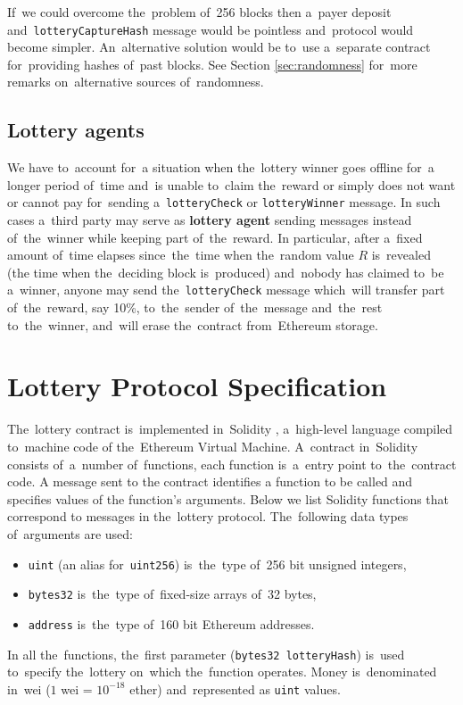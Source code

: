 \documentclass[a4paper]{article}
\begin{document}
    If~we could overcome the~problem of~256 blocks then a~payer deposit and~\texttt{lotteryCaptureHash} message would
    be pointless and~protocol would become simpler. An~alternative solution would be to~use a~separate contract
    for~providing hashes of~past blocks. See Section \ref{sec:randomness} for~more remarks on~alternative sources
    of~randomness.
\subsection{Lottery agents}
    We have to~account for~a situation when the~lottery winner goes offline for~a longer period of~time and~is
    unable to~claim the~reward or simply does not want or cannot pay for~sending a~\texttt{lotteryCheck} or
    \texttt{lotteryWinner} message. In such cases a~third party may serve as \textbf{lottery agent} sending messages
    instead of~the~winner while keeping part of~the~reward. In particular, after a~fixed amount of~time elapses
    since~the~time when the~random value $R$ is~revealed (the time when the~deciding block is~produced) and~nobody has
    claimed to~be a~winner, anyone may send the~\texttt{lotteryCheck} message which~will transfer part of~the~reward,
    say 10\%, to~the~sender of~the~message and~the~rest to~the~winner, and~will erase the~contract from~Ethereum
    storage.

\section{Lottery Protocol Specification}
\label{sec:lottery-protocol}
    The~lottery contract is~implemented in~Solidity \cite{SOLIDITY}, a~high-level language compiled to~machine code of
    the~Ethereum Virtual Machine\cite{ETHERDEV}. A~contract in~Solidity consists of~a~number of~functions, each
    function is~a~entry point to~the~contract code. A message sent to the contract identifies a function to be called
    and specifies values of the function's arguments. Below we list Solidity functions that correspond to messages
    in the~lottery protocol. The~following data types of~arguments are used:
    \begin{itemize}
        \item \texttt{uint} (an alias for~\texttt{uint256}) is~the~type of~256 bit unsigned integers,
        \item \texttt{bytes32} is~the~type of~fixed-size arrays of~32 bytes,
        \item \texttt{address} is~the~type of~160 bit Ethereum addresses.
    \end{itemize}
    In all the~functions, the~first parameter (\texttt{bytes32 lotteryHash}) is~used to~specify the~lottery on~which
    the~function operates. Money is~denominated in~wei ($1$ wei = $10^{-18}$ ether) and~represented as \texttt{uint} values.
\end{document}
